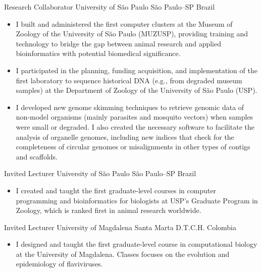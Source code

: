 \documentclass[11pt, letterpaper, sans]{moderncv}
\begin{document}
    \vspace{-0.5em}
    	{Research Collaborator}
    	{University of São Paulo}
    	{São Paulo--SP}
    	{Brazil}
    	{}
    \vspace{-1em}
    \begin{itemize}[itemsep=-0.05in, labelindent=0in, leftmargin=1cm]\small
	    \item[\textcolor{color1}{\textbullet}] I built and administered the first computer clusters at the Museum of Zoology of the University of São Paulo (MUZUSP), providing training and technology to bridge the gap between animal research and applied bioinformatics with potential biomedical significance.
	    \item[\textcolor{color1}{\textbullet}] I participated in the planning, funding acquisition, and implementation of the first laboratory to sequence historical DNA (e.g., from degraded museum samples) at the Department of Zoology of the University of São Paulo (USP).
	    \item[\textcolor{color1}{\textbullet}] I developed new genome skimming techniques to retrieve genomic data of non-model organisms (mainly parasites and mosquito vectors) when samples were small or degraded. I also created the necessary software to facilitate the analysis of organelle genomes, including new indices that check for the completeness of circular genomes or misalignments in other types of contigs and scaffolds.
    \end{itemize}
    	{Invited Lecturer}
    	{University of São Paulo}
    	{São Paulo--SP}
    	{Brazil}
    	{}
    \vspace{-1em}
    \begin{itemize}[itemsep=-0.05in, labelindent=0in, leftmargin=1cm]\small
	    \item[\textcolor{color1}{\textbullet}] I created and taught the first graduate-level courses in computer programming and bioinformatics for biologists at USP's Graduate Program in Zoology, which is ranked first in animal research worldwide.
	\end{itemize}
    \vspace{-0.5em}
    	{Invited Lecturer}
    	{University of Magdalena}
    	{Santa Marta D.T.C.H.}
    	{Colombia}
    	{}
    \vspace{-1em}
    \begin{itemize}[itemsep=-0.05in, labelindent=0in, leftmargin=1cm]\small
	    \item[\textcolor{color1}{\textbullet}] I designed and taught the first graduate-level course in computational biology at the University of Magdalena. Classes focuses on the evolution and epidemiology of flaviviruses.
	\end{itemize}
\end{document}

